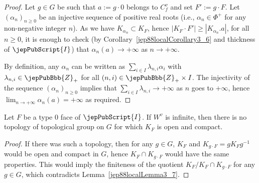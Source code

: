 \begin{proof}
Let $g\in G$ be such that $a:=g\cdot0$ belongs to $C_f^v$ and set $F':=g\cdot F$. Let $(\alpha_n)_{n\geqslant0}$ be an injective sequence of positive real roots (i.e., $\alpha_n\in\Phi^+$ for any non-negative integer $n$). As we have $K_{\alpha_n}\subset K_F$, hence $|K_F\cdot F'|\geqslant|K_{\alpha_n}.a|$, for all $n\geqslant0$, it is enough to check (by Corollary~\ref{jep88localCorollary3_6} and thickness of $\jepPubScript{I}$) that $\alpha_n(a)\to+\infty$ as $n\to+\infty$.

By definition, any $\alpha_n$ can be written as $\sum_{i\in I}\lambda_{n,i}\alpha_i$ with $\lambda_{n,i}\in\jepPubBbb{Z}_+$ for all $(n,i)\in\jepPubBbb{Z}_+\times I$. The injectivity of the sequence $(\alpha_n)_{n\geqslant0}$ implies that $\sum_{i\in I}\lambda_{n,i}\to+\infty$ as $n$ goes to $+\infty$, hence $\lim_{n\to+\infty}\alpha_n(a)=+\infty$ as required.
\end{proof}
\begin{corollary}\label{jep88localCorollary3_8}
Let $F$ be a type $0$ face of $\jepPubScript{I}$. If $W^v$ is infinite, then there is no topology of topological group on $G$ for which $K_F$ is open and compact.
\end{corollary}
\begin{proof}
If there was such a topology, then for any $g\in G$, $K_F$ and $K_{g\cdot F}=gK_Fg^{-1}$ would be open and compact in $G$, hence $K_F\cap K_{g\cdot F}$ would have the same properties. This would imply the finiteness of the quotient $K_F/K_F\cap K_{g\cdot F}$ for any $g\in G$, which contradicts Lemma~\ref{jep88localLemma3_7}.
\end{proof}
